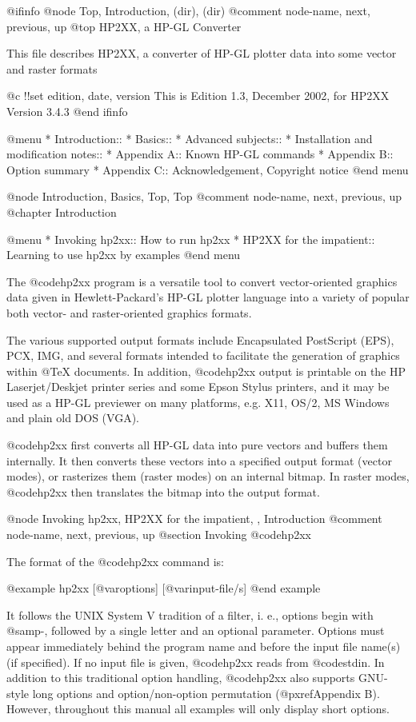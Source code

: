 @ifinfo
@node Top, Introduction, (dir), (dir)
@comment  node-name,  next,  previous,  up
@top HP2XX, a HP-GL Converter

This file describes HP2XX, a converter of HP-GL plotter data into
some vector and raster formats

@c !!set edition, date, version
This is Edition 1.3, December 2002, for HP2XX Version 3.4.3
@end ifinfo


@menu
* Introduction::
* Basics::
* Advanced subjects::
* Installation and modification notes::
* Appendix A::                          Known HP-GL commands
* Appendix B::                          Option summary
* Appendix C::                          Acknowledgement, Copyright notice
@end menu

@node Introduction, Basics, Top, Top
@comment  node-name,  next,  previous,  up
@chapter Introduction

@menu
* Invoking hp2xx::          How to run hp2xx
* HP2XX for the impatient:: Learning to use hp2xx by examples
@end menu

The @code{hp2xx} program is a versatile tool to convert vector-oriented
graphics data given in Hewlett-Packard's HP-GL plotter language
into a variety of popular both vector- and raster-oriented graphics formats.

The various supported output formats include Encapsulated PostScript (EPS),
PCX, IMG, and several formats intended to facilitate the generation of
graphics within @TeX{} documents.
In addition, @code{hp2xx} output is printable on the HP Laserjet/Deskjet
printer series and some Epson Stylus printers, and it may be used as a HP-GL 
previewer on many platforms, e.g. X11, OS/2, MS Windows and plain old DOS (VGA).

@code{hp2xx} first converts all HP-GL data into pure vectors and buffers
them internally. It then converts these vectors into a specified output
format (vector modes), or rasterizes them (raster modes) on an internal
bitmap. In raster modes, @code{hp2xx} then translates the bitmap into the
output format.



@node Invoking hp2xx, HP2XX for the impatient, , Introduction
@comment  node-name,  next,  previous,  up
@section Invoking @code{hp2xx}

The format of the @code{hp2xx} command is:

@example
hp2xx [@var{options}] [@var{input-file/s}]
@end example

It follows the UNIX System V tradition of a filter, i. e., options begin
with @samp{-}, followed by a single letter and an optional parameter.
Options must appear immediately behind the program name and before the input
file name(s) (if specified). If no input file is given, @code{hp2xx} reads
from @code{stdin}. In addition to this traditional option handling,
@code{hp2xx} also supports GNU-style long options and option/non-option
permutation (@pxref{Appendix B}). However, throughout this manual
all examples will only display short options.


